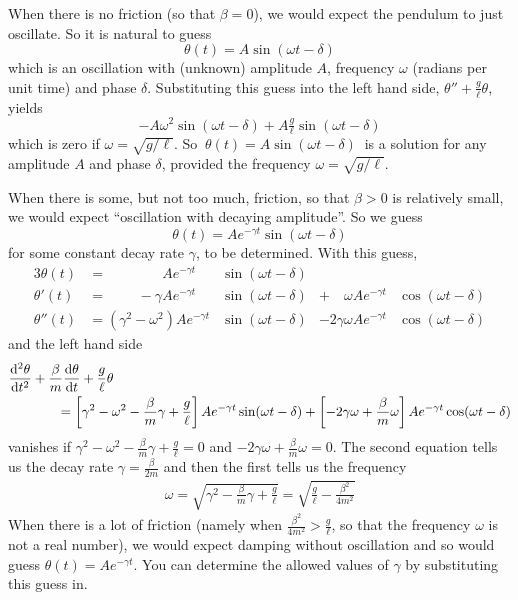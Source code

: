When there is no friction (so that $\beta=0$),
we would expect the pendulum to just oscillate. So it is natural to guess
\begin{equation*}
\theta(t)=A\sin(\omega t-\delta)
\end{equation*}
which is an oscillation with (unknown) amplitude $A$, 
frequency $\omega$ (radians per unit time) and 
phase $\delta$. Substituting this guess into the left hand side, 
$\theta''+\tfrac{g}{\ell}\theta$,  yields 
\begin{equation*}
-A\omega^2\sin(\omega t-\delta)+A\tfrac{g}{\ell}\sin(\omega t-\delta)
\end{equation*} 
which is zero if $\omega=\sqrt{g/\ell}$. So
$\ \theta(t)=A\sin(\omega t-\delta)\ $ is a solution for any amplitude 
$A$ and phase $\delta$, provided the frequency $\omega=\sqrt{g/\ell}$. 

When there is some, but not too much, friction, so that $\beta>0$ is 
relatively small, we would expect ``oscillation with decaying amplitude''. 
So we  guess 
\begin{equation*}
\theta(t)=Ae^{-\gamma t}\sin(\omega t-\delta)
\end{equation*}
for some constant decay rate $\gamma$, to be determined.
With this guess,
\begin{alignat*}{3}
\theta(t)&=\phantom{- -\gamma\omega^{2})} Ae^{-\gamma t}
                   &\sin(\omega t-\delta)\\
\theta'(t)&=\phantom{-\omega^{2})}-\gamma Ae^{-\gamma t}
                  &\sin(\omega t-\delta)
&+\phantom{2\gamma }\omega A e^{-\gamma t}&\cos(\omega t-\delta)\\
\theta''(t)&=(\gamma^2-\omega^2)Ae^{-\gamma t}&\sin(\omega t-\delta)
                    &-2\gamma\omega A e^{-\gamma t}&\cos(\omega t-\delta)
\end{alignat*}
and the left hand side
\begin{align*}
&\ddiff{2}{\theta}{t}+\frac{\beta}{m}\diff{\theta}{t}+\frac{g}{\ell}\theta
 \\
&\hskip0.5in
=\left[\gamma^2-\omega^2-\frac{\beta}{m}\gamma+\frac{g}{\ell}\right] 
                         Ae^{-\gamma t}\sin(\omega t-\delta)
+\left[-2\gamma\omega+\frac{\beta}{m}\omega\right] 
                         Ae^{-\gamma t}\cos(\omega t-\delta)
\end{align*}
vanishes if $\gamma^2-\omega^2-\frac{\beta}{m}\gamma+\tfrac{g}{\ell}=0$ and 
$-2\gamma\omega+\frac{\beta}{m}\omega=0.$ The second equation tells us the decay
rate $\gamma=\tfrac{\beta}{2m}$ and then the first tells us the frequency
\begin{align*}
\omega=\sqrt{\gamma^2-\tfrac{\beta}{m}\gamma+\tfrac{g}{\ell}}
=\sqrt{\tfrac{g}{\ell}-\tfrac{\beta^2}{4m^2}}
\end{align*} 
When there is a lot of friction
(namely when $\tfrac{\beta^2}{4m^2}>\tfrac{g}{\ell}$, so that the frequency
$\omega$ is not a real number), we would expect damping without oscillation 
and so would guess $\theta(t)=Ae^{-\gamma t}$. You can determine the allowed
values of $\gamma$ by substituting this guess in. 


